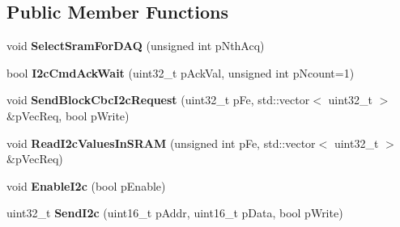 \subsection*{Public Member Functions}
\begin{DoxyCompactItemize}
\item 
\hypertarget{class_ph2___hw_interface_1_1_c_b_c_interface_aedf94ec28ee80c5207b8ae9f38192369}{void {\bfseries Select\-Sram\-For\-D\-A\-Q} (unsigned int p\-Nth\-Acq)}\label{class_ph2___hw_interface_1_1_c_b_c_interface_aedf94ec28ee80c5207b8ae9f38192369}

\item 
\hypertarget{class_ph2___hw_interface_1_1_c_b_c_interface_a8dff31d5f9575070179612b5b9335aa4}{bool {\bfseries I2c\-Cmd\-Ack\-Wait} (uint32\-\_\-t p\-Ack\-Val, unsigned int p\-Ncount=1)}\label{class_ph2___hw_interface_1_1_c_b_c_interface_a8dff31d5f9575070179612b5b9335aa4}

\item 
\hypertarget{class_ph2___hw_interface_1_1_c_b_c_interface_af6eeb7700b550a51acca3441180ddc33}{void {\bfseries Send\-Block\-Cbc\-I2c\-Request} (uint32\-\_\-t p\-Fe, std\-::vector$<$ uint32\-\_\-t $>$ \&p\-Vec\-Req, bool p\-Write)}\label{class_ph2___hw_interface_1_1_c_b_c_interface_af6eeb7700b550a51acca3441180ddc33}

\item 
\hypertarget{class_ph2___hw_interface_1_1_c_b_c_interface_a07b718e617fb6e992764c724edd4d406}{void {\bfseries Read\-I2c\-Values\-In\-S\-R\-A\-M} (unsigned int p\-Fe, std\-::vector$<$ uint32\-\_\-t $>$ \&p\-Vec\-Req)}\label{class_ph2___hw_interface_1_1_c_b_c_interface_a07b718e617fb6e992764c724edd4d406}

\item 
\hypertarget{class_ph2___hw_interface_1_1_c_b_c_interface_ad79c9b9ec21e78d35fd0c62e48ba6784}{void {\bfseries Enable\-I2c} (bool p\-Enable)}\label{class_ph2___hw_interface_1_1_c_b_c_interface_ad79c9b9ec21e78d35fd0c62e48ba6784}

\item 
\hypertarget{class_ph2___hw_interface_1_1_c_b_c_interface_a9c34bda282edef6fec34245969ac59a0}{uint32\-\_\-t {\bfseries Send\-I2c} (uint16\-\_\-t p\-Addr, uint16\-\_\-t p\-Data, bool p\-Write)}\label{class_ph2___hw_interface_1_1_c_b_c_interface_a9c34bda282edef6fec34245969ac59a0}

\end{DoxyCompactItemize}
